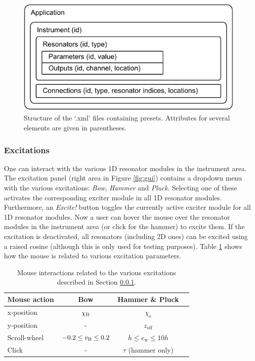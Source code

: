 \documentclass{article}
\begin{document}
\begin{figure}[h]
    \centering
    \includegraphics[width = \columnwidth]{presetStructure.pdf}
    \caption{Structure of the `.xml' files containing presets. Attributes for several elements are given in parentheses. %
    }
    \label{fig:presetStructure}
\end{figure}

\subsubsection{Excitations}\label{sec:excitationPanel}
One can interact with the various 1D resonator modules in the instrument area. The excitation panel (right area in Figure \ref{fig:gui}) contains a dropdown menu with the various excitations: \textit{Bow}, \textit{Hammer} and \textit{Pluck}. Selecting one of these activates the corresponding exciter module in all 1D resonator modules. Furthermore, an \textit{Excite!} button toggles the currently active exciter module for all 1D resonator modules. Now a user can hover the mouse over the resonator modules in the instrument area (or click for the hammer) to excite them. If the excitation is deactivated, all resonators (including 2D ones) can be excited using a raised cosine (although this is only used for testing purposes). Table \ref{tab:interactions} shows how the mouse is related to various excitation parameters.

\begin{table}[t]\label{tab:interactions}
\begin{center}
\begin{tabular}{|l|c|c|c|}
    \hline
    Mouse action & Bow & Hammer \& Pluck\\ \hline
    x-position & $\chi_{\text{B}}$& $\chi_\text{e}$ \\
    y-position & - & $z_\text{off}$ \\
    Scroll-wheel & $-0.2\leq v_{\text{B}}\leq 0.2$ & $ h \leq e_\text{w} \leq 10 h$\\
    Click & - & $\tau$ (hammer only) \\\hline
\end{tabular}
\caption{Mouse interactions related to the various excitations described in Section \ref{sec:excitationPanel}.}
\end{center}
\end{table}
\end{document}
